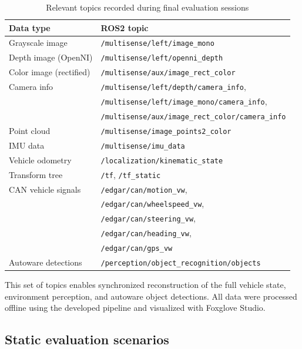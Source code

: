 \begin{table}[H]
  \centering
  \begin{tabular}{l l}
    \toprule
    \textbf{Data type} & \textbf{ROS2 topic} \\
    \midrule
    Grayscale image & \texttt{/multisense/left/image\_mono} \\
    Depth image (OpenNI) & \texttt{/multisense/left/openni\_depth} \\
    Color image (rectified) & \texttt{/multisense/aux/image\_rect\_color} \\
    Camera info & \texttt{/multisense/left/depth/camera\_info}, \\
                & \texttt{/multisense/left/image\_mono/camera\_info}, \\
                & \texttt{/multisense/aux/image\_rect\_color/camera\_info} \\
    Point cloud & \texttt{/multisense/image\_points2\_color} \\
    IMU data & \texttt{/multisense/imu\_data} \\
    Vehicle odometry & \texttt{/localization/kinematic\_state} \\
    Transform tree & \texttt{/tf}, \texttt{/tf\_static} \\
    CAN vehicle signals & \texttt{/edgar/can/motion\_vw}, \\
                        & \texttt{/edgar/can/wheelspeed\_vw}, \\
                        & \texttt{/edgar/can/steering\_vw}, \\
                        & \texttt{/edgar/can/heading\_vw}, \\
                        & \texttt{/edgar/can/gps\_vw} \\
    Autoware detections & \texttt{/perception/object\_recognition/objects} \\
    \bottomrule
  \end{tabular}
  \caption{Relevant topics recorded during final evaluation sessions}\label{tab:recorded_topics}
\end{table}

This set of topics enables synchronized reconstruction of the full vehicle 
state, environment perception, and autoware object detections. All data were 
processed offline using the developed pipeline and visualized with Foxglove Studio.


\subsection{Static evaluation scenarios}

